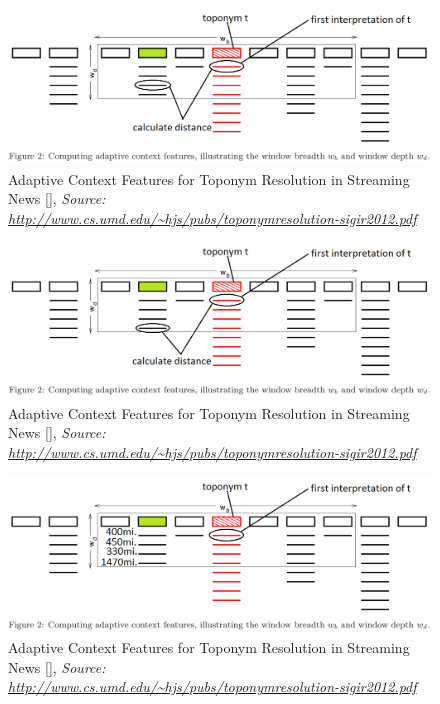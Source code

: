 \documentclass{beamer}
\begin{document}
{\begin{overprint}
		\begin{figure}
			\includegraphics[width=\textwidth]{adaptive-proximity-f.png} 
			\caption{Adaptive Context Features for Toponym Resolution in Streaming News [], \textit{Source: \url{http://www.cs.umd.edu/~hjs/pubs/toponymresolution-sigir2012.pdf}}}
		\end{figure}
		
		\begin{figure}
			\includegraphics[width=\textwidth]{adaptive-proximity-g.png} 
			\caption{Adaptive Context Features for Toponym Resolution in Streaming News [], \textit{Source: \url{http://www.cs.umd.edu/~hjs/pubs/toponymresolution-sigir2012.pdf}}}
		\end{figure}
		
		\begin{figure}
			\includegraphics[width=\textwidth]{adaptive-proximity-h.png} 
			\caption{Adaptive Context Features for Toponym Resolution in Streaming News [], \textit{Source: \url{http://www.cs.umd.edu/~hjs/pubs/toponymresolution-sigir2012.pdf}}}
		\end{figure}
		

\end{overprint}}
\end{document}
